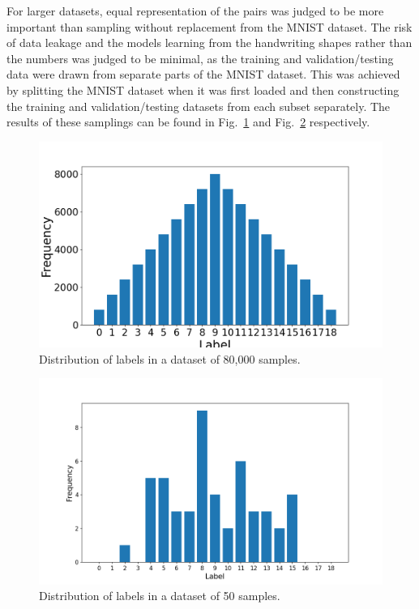 \documentclass[11pt,a4paper]{article}
\begin{document}
For larger datasets, equal representation of the pairs was judged to be more important than sampling without replacement from the MNIST dataset. The risk of data leakage and the models learning from the handwriting shapes rather than the numbers was judged to be minimal, as the training and validation/testing data were drawn from separate parts of the MNIST dataset. This was achieved by splitting the MNIST dataset when it was first loaded and then constructing the training and validation/testing datasets from each subset separately. The results of these samplings can be found in Fig.~\ref{fig:manysamples} and Fig.~\ref{fig:fewsamples} respectively.

\begin{figure}
    \centering
    \includegraphics[width=\columnwidth, keepaspectratio]{../Y_dist_many.png}
    \caption{Distribution of labels in a dataset of 80,000 samples.}\label{fig:manysamples}
\end{figure}

\begin{figure}
    \centering
    \includegraphics[width=\columnwidth, keepaspectratio]{../Y_dist_few.png}
    \caption{Distribution of labels in a dataset of 50 samples.}\label{fig:fewsamples}
\end{figure}
\end{document}

